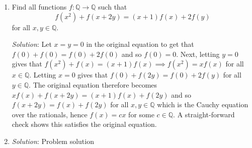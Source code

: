\documentclass{article}
\begin{document}
\begin{enumerate}[1.]
\item %
\newcommand{\QQ}{\mathbb{Q}}
Find all functions $f : \QQ \to \QQ$ such that
\[ f(x^2) +f(x+2y) = (x+1)f(x) +2f(y) \]
for all $x, y \in \QQ$. 

\textit{Solution}: 
Let $x=y=0$ in the original equation to get that $f(0)+f(0)=f(0)+2f(0)$ and so $f(0)=0$. Next, letting $y=0$ gives that $f(x^2)+f(x)=(x+1)f(x) \implies f(x^2)=xf(x)$ for all $x \in \QQ$. Letting $x=0$ gives that $f(0)+f(2y)=f(0)+2f(y)$ for all $y \in \QQ$. The original equation therefore becomes $xf(x)+f(x+2y)=(x+1)f(x)+f(2y)$ and so $f(x+2y)=f(x)+f(2y)$ for all $x,y \in \QQ$ which is the Cauchy equation over the rationals, hence $f(x)=cx$ for some $c\in\QQ$. A straight-forward check shows this satisfies the original equation.


\item %

\textit{Solution}: Problem solution

\end{enumerate}
\end{document}

